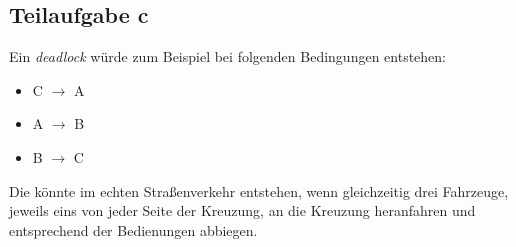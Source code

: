 \documentclass[koma,a4paper,10pt]{scrartcl}
\begin{document}
\subsection{Teilaufgabe c}
\label{sec-4-3}
Ein \textit{deadlock} würde zum Beispiel bei folgenden Bedingungen entstehen:
\begin{itemize}
\item C $\to$ A
\item A $\to$ B
\item B $\to$ C
\end{itemize}
Die könnte im echten Straßenverkehr entstehen, wenn gleichzeitig drei Fahrzeuge, jeweils eins von jeder Seite der Kreuzung, an die Kreuzung heranfahren und entsprechend der Bedienungen abbiegen.
\end{document}
